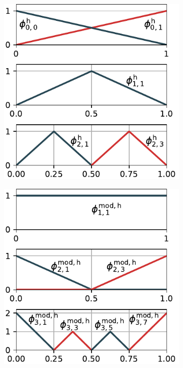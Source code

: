 \documentclass[
  a4paper,  %
  twoside,  %
  bibliography=totoc,
  headsepline,
  cleardoublepage=empty,
  parskip=half,
  draft=false
]{scrbook}
\begin{document}
\begin{mdframed}[style=style]
\begin{figure}[H]
\begin{subfigure}{.5\textwidth}
  \includegraphics[width=\linewidth]{graphics/basis_hat}
  \label{fig:basis_hat_normal}
\vspace{1.5mm}
\end{subfigure}%
\begin{subfigure}{.5\textwidth}
  \includegraphics[width=\linewidth]{graphics/basis_mod}

\end{subfigure}
\end{figure}
\end{mdframed}
\end{document}
